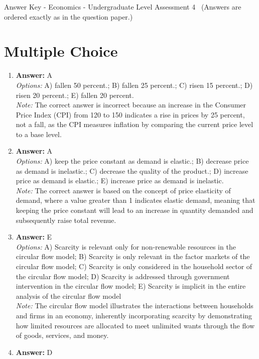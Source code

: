 \documentclass[12pt]{article}
\begin{document}
\begin{center}
Answer Key - Economics - Undergraduate Level Assessment 4 \
\small (Answers are ordered exactly as in the question paper.)
\end{center}

\section*{Multiple Choice}
\begin{enumerate}[label=\arabic*.]
\item \textbf{Answer:} A
\\ \textit{Options:} A) fallen 50 percent.; B) fallen 25 percent.; C) risen 15 percent.; D) risen 20 percent.; E) fallen 20 percent.
\\ \textit{Note:} The correct answer is incorrect because an increase in the Consumer Price Index (CPI) from 120 to 150 indicates a rise in prices by 25 percent, not a fall, as the CPI measures inflation by comparing the current price level to a base level.
\item \textbf{Answer:} A
\\ \textit{Options:} A) keep the price constant as demand is elastic.; B) decrease price as demand is inelastic.; C) decrease the quality of the product.; D) increase price as demand is elastic.; E) increase price as demand is inelastic.
\\ \textit{Note:} The correct answer is based on the concept of price elasticity of demand, where a value greater than 1 indicates elastic demand, meaning that keeping the price constant will lead to an increase in quantity demanded and subsequently raise total revenue.
\item \textbf{Answer:} E
\\ \textit{Options:} A) Scarcity is relevant only for non-renewable resources in the circular flow model; B) Scarcity is only relevant in the factor markets of the circular flow model; C) Scarcity is only considered in the household sector of the circular flow model; D) Scarcity is addressed through government intervention in the circular flow model; E) Scarcity is implicit in the entire analysis of the circular flow model
\\ \textit{Note:} The circular flow model illustrates the interactions between households and firms in an economy, inherently incorporating scarcity by demonstrating how limited resources are allocated to meet unlimited wants through the flow of goods, services, and money.
\item \textbf{Answer:} D

\end{enumerate}
\end{document}
